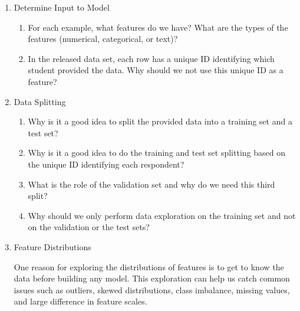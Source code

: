 \documentclass[12pt]{article}
\begin{document}
\begin{enumerate}

\item Determine Input to Model 

\begin{enumerate}

\item For each example, what features do we have? What are the types of the features (numerical, categorical, or text)? 

\item In the released data set, each row has a unique ID identifying which student provided the data. Why should we not use this unique ID as a feature?


\end{enumerate}

\item Data Splitting

\begin{enumerate}

\item Why is it a good idea to split the provided data into a training set and a test set? 

\item Why is it a good idea to do the training and test set splitting based on the unique ID identifying each respondent? 

\item What is the role of the validation set and why do we need this third split?

\item Why should we only perform data exploration on the training set and not on the validation or the test sets?

\end{enumerate}

\item Feature Distributions

\smallskip
One reason for exploring the distributions of features is to get to know the data before building any model. This exploration can help us catch common issues such as outliers, skewed distributions, class imbalance, missing values, and large difference in feature scales.
   
\smallskip
\begin{enumerate}


\end{enumerate}
\end{enumerate}
\end{document}
